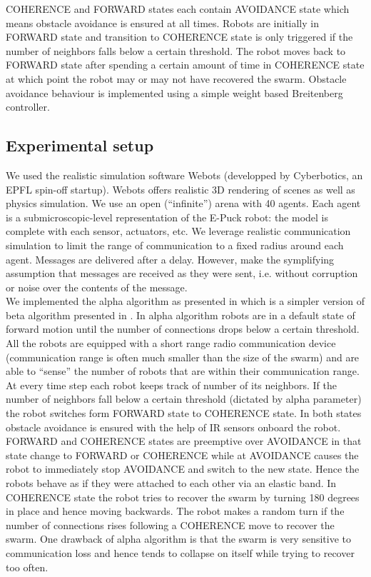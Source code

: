 \documentclass[a4paper, 10pt, conference]{ieeeconf}
\begin{document}
COHERENCE and FORWARD states each contain AVOIDANCE state which means obstacle avoidance is ensured at all times. Robots are initially in FORWARD state and transition to COHERENCE state is only triggered if the number of neighbors falls below a certain  threshold. The robot moves back to FORWARD state after spending a certain amount of time in COHERENCE state at which point the robot may or may not have recovered the swarm. Obstacle avoidance behaviour is implemented using a simple weight based Breitenberg controller.


  \subsection{Experimental setup} \label{simulations}
  We used the realistic simulation software Webots (developped by Cyberbotics, an EPFL spin-off startup). Webots offers realistic 3D rendering of scenes as well as physics simulation. We use an open (``infinite'') arena with 40 agents. Each agent is a submicroscopic-level representation of the E-Puck robot: the model is complete with each sensor, actuators, etc. We leverage realistic communication simulation to limit the range of communication to a fixed radius around each agent. Messages are delivered after a delay. However, make the symplifying assumption that messages are received as they were sent, i.e. without corruption or noise over the contents of the message.\\

  We implemented the alpha algorithm as presented in \cite{Winfield08} which is a simpler version of beta algorithm presented in \cite{Nembrini02}. In alpha algorithm robots are in a default state of forward motion until the number of connections drops below a certain threshold. All the robots are equipped with a short range radio communication device (communication range is often much smaller than the size of the swarm) and are able to ``sense'' the number of robots that are within their communication range. At every time step each robot keeps track of number of its neighbors. If the number of neighbors fall below a certain threshold (dictated by alpha parameter) the robot switches form FORWARD state to COHERENCE state. In both states obstacle avoidance is ensured with the help of IR sensors onboard the robot. FORWARD and COHERENCE states are preemptive over AVOIDANCE in that state change to FORWARD or COHERENCE while at AVOIDANCE causes the robot to immediately stop AVOIDANCE and switch to the new state.  Hence the robots behave as if they were attached to each other via an elastic band. In COHERENCE state the robot tries to recover the swarm by turning 180 degrees in place and hence moving backwards. The robot makes a random turn if the number of connections rises following a COHERENCE move to recover the swarm. One drawback of alpha algorithm is that the swarm is very sensitive to communication loss and hence tends to collapse on itself while trying to recover too often.
\end{document}

